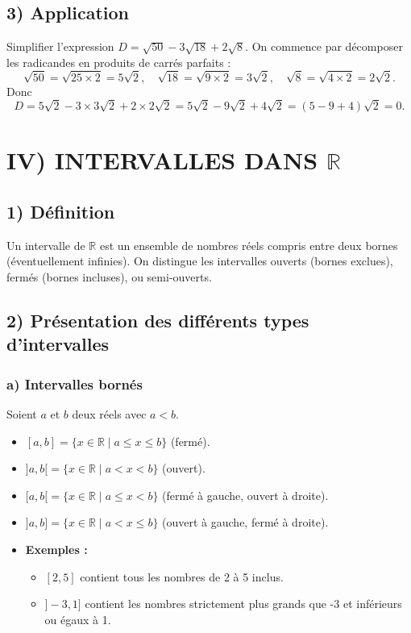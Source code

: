 \documentclass[12pt,a4paper]{article}
\begin{document}
\subsection*{\color{myred} 3) Application}
Simplifier l'expression $D = \sqrt{50} - 3\sqrt{18} + 2\sqrt{8}$.
On commence par décomposer les radicandes en produits de carrés parfaits :
\[
\sqrt{50} = \sqrt{25 \times 2} = 5\sqrt{2}, \quad
\sqrt{18} = \sqrt{9 \times 2} = 3\sqrt{2}, \quad
\sqrt{8} = \sqrt{4 \times 2} = 2\sqrt{2}.
\]
Donc
\[
D = 5\sqrt{2} - 3 \times 3\sqrt{2} + 2 \times 2\sqrt{2}
= 5\sqrt{2} - 9\sqrt{2} + 4\sqrt{2} = (5-9+4)\sqrt{2} = 0.
\]


\section*{\color{myred} IV) INTERVALLES DANS $\mathbb{R}$}

\subsection*{\color{myred} 1) Définition}
Un intervalle de $\mathbb{R}$ est un ensemble de nombres réels compris entre deux bornes (éventuellement infinies). On distingue les intervalles ouverts (bornes exclues), fermés (bornes incluses), ou semi-ouverts.

\subsection*{\color{myred} 2) Présentation des différents types d'intervalles}

\subsubsection*{\color{myred} a) Intervalles bornés}
Soient $a$ et $b$ deux réels avec $a < b$.
\begin{itemize}
    \item $[a, b] = \{ x \in \mathbb{R} \mid a \leq x \leq b \}$ (fermé).
    \item $]a, b[ = \{ x \in \mathbb{R} \mid a < x < b \}$ (ouvert).
    \item $[a, b[ = \{ x \in \mathbb{R} \mid a \leq x < b \}$ (fermé à gauche, ouvert à droite).
    \item $]a, b] = \{ x \in \mathbb{R} \mid a < x \leq b \}$ (ouvert à gauche, fermé à droite).
\end{itemize}

\begin{itemize}
    \item \textbf{Exemples :}
    \begin{itemize}
        \item $[2, 5]$ contient tous les nombres de 2 à 5 inclus.
        \item $]-3, 1]$ contient les nombres strictement plus grands que -3 et inférieurs ou égaux à 1.
    \end{itemize}
\end{itemize}
\end{document}
